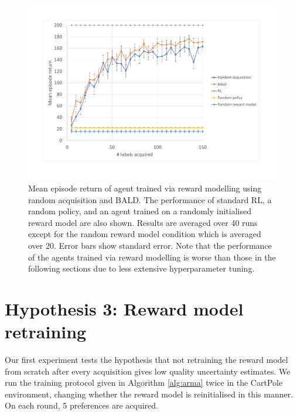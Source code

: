 \documentclass[11pt, a4paper, bibliography=totoc]{report}
\begin{document}
\begin{figure}[h]
	\centering
	\includegraphics[width=\textwidth]{cartpole_curve}
	\caption{Mean episode return of agent trained via reward modelling using random acquisition and BALD. The performance of standard RL, a random policy, and an agent trained on a randomly initialised reward model are also shown. Results are averaged over 40 runs except for the random reward model condition which is averaged over 20. Error bars show standard error. Note that the performance of the agents trained via reward modelling is worse than those in the following sections due to less extensive hyperparameter tuning.}
	\label{fig:cartpole_curve}
\end{figure}

\section{Hypothesis 3: Reward model retraining}
Our first experiment tests the hypothesis that not retraining the reward model from scratch after every acquisition gives low quality uncertainty estimates. We run the training protocol given in Algorithm \ref{alg:arma} twice in the CartPole environment, changing whether the reward model is reinitialised in this manner. On each round, 5 preferences are acquired.
\end{document}

